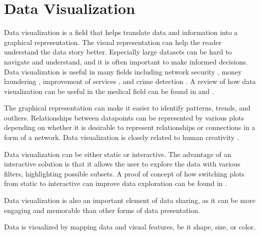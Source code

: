 \chapter{Data Visualization}
\label{chap:dataviz}
Data visualization is a field that helps translate data and information into a graphical representation. The visual representation can help the reader understand the data story better. Especially large datasets can be hard to navigate and understand, and it is often important to make informed decisions. Data visualization is useful in many fields including network security \citep{shiravi2011survey}, money laundering \citep{singh2019anti}, improvement of services \cite{alharthi2017data}, and crime detection \citep{feng2019big}. A review of how data visualization can be useful in the medical field can be found in \cite{park2022impact} and \cite{aung2019leveraging}.

The graphical representation can make it easier to identify patterns, trends, and outliers. Relationships between datapoints can be represented by various plots depending on whether it is desirable to represent relationships or connections in a form of a network. Data visualization is closely related to human creativity \citep{dove2013using, li2018data}. 

Data visualization can be either static or interactive. The advantage of an interactive solution is that it allows the user to explore the data with various filters, highlighting possible subsets. A proof of concept of how switching plots from static to interactive can improve data exploration can be found in \cite{weissgerber2016static}. 

Data visualization is also an important element of data sharing, as it can be more engaging and memorable than other forms of data presentation. 

Data is visualized by mapping data and visual features, be it shape, size, or color. 

